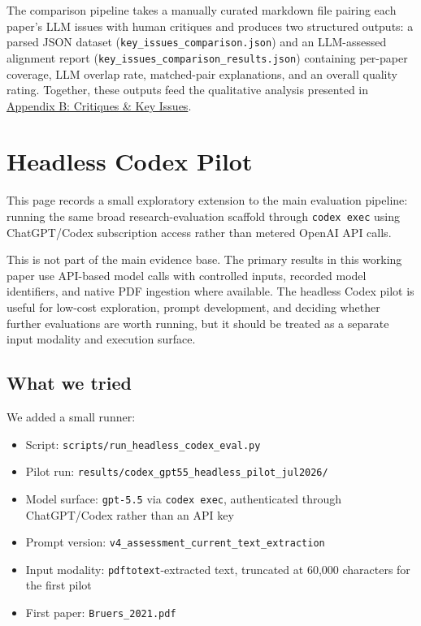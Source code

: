 \documentclass[
  11pt,
  letterpaper,
]{article}
\providecommand{\tightlist}{%
  \setlength{\itemsep}{0pt}\setlength{\parskip}{0pt}}
\begin{document}
The comparison pipeline takes a manually curated markdown file pairing
each paper's LLM issues with human critiques and produces two structured
outputs: a parsed JSON dataset (\texttt{key\_issues\_comparison.json})
and an LLM-assessed alignment report
(\texttt{key\_issues\_comparison\_results.json}) containing per-paper
coverage, LLM overlap rate, matched-pair explanations, and an overall
quality rating. Together, these outputs feed the qualitative analysis
presented in \href{results_critiques.qmd}{Appendix B: Critiques \& Key
Issues}.

\normalsize


\section{Headless Codex Pilot}\label{headless-codex-pilot}

This page records a small exploratory extension to the main evaluation
pipeline: running the same broad research-evaluation scaffold through
\texttt{codex\ exec} using ChatGPT/Codex subscription access rather than
metered OpenAI API calls.

This is not part of the main evidence base. The primary results in this
working paper use API-based model calls with controlled inputs, recorded
model identifiers, and native PDF ingestion where available. The
headless Codex pilot is useful for low-cost exploration, prompt
development, and deciding whether further evaluations are worth running,
but it should be treated as a separate input modality and execution
surface.

\subsection{What we tried}\label{what-we-tried}

We added a small runner:

\begin{itemize}
\tightlist
\item
  Script: \texttt{scripts/run\_headless\_codex\_eval.py}
\item
  Pilot run: \texttt{results/codex\_gpt55\_headless\_pilot\_jul2026/}
\item
  Model surface: \texttt{gpt-5.5} via \texttt{codex\ exec},
  authenticated through ChatGPT/Codex rather than an API key
\item
  Prompt version: \texttt{v4\_assessment\_current\_text\_extraction}
\item
  Input modality: \texttt{pdftotext}-extracted text, truncated at 60,000
  characters for the first pilot
\item
  First paper: \texttt{Bruers\_2021.pdf}
\end{itemize}
\end{document}
